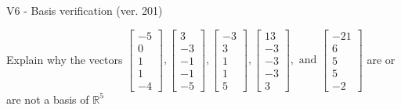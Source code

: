 \begin{exercise}
  \begin{exerciseTitle}V6 - Basis verification (ver. 201)\end{exerciseTitle}
  \begin{exerciseStatement}
    Explain why the vectors \(\left[\begin{array}{r}
-5 \\
0 \\
1 \\
1 \\
-4
\end{array}\right] , \left[\begin{array}{r}
3 \\
-3 \\
-1 \\
-1 \\
-5
\end{array}\right] , \left[\begin{array}{r}
-3 \\
3 \\
1 \\
1 \\
5
\end{array}\right] , \left[\begin{array}{r}
13 \\
-3 \\
-3 \\
-3 \\
3
\end{array}\right] , \text{ and } \left[\begin{array}{r}
-21 \\
6 \\
5 \\
5 \\
-2
\end{array}\right]\) are or are not a basis of \(\mathbb{R}^5\)	



\end{exerciseStatement}
\end{exercise}
